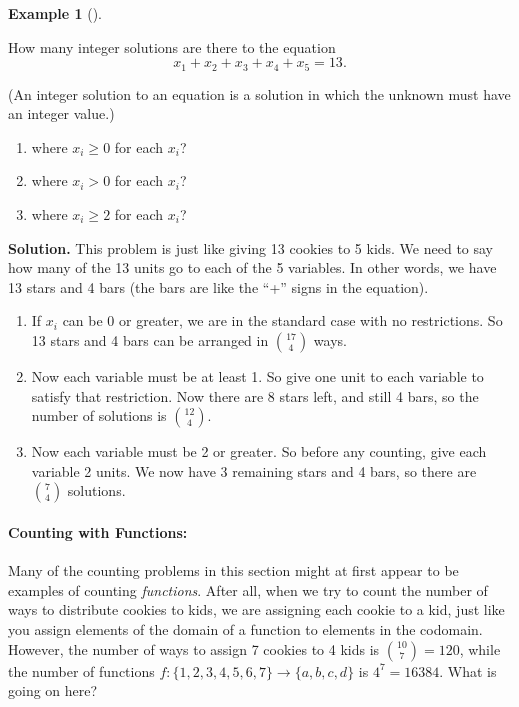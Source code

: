 \documentclass[10pt,]{book}
\theoremstyle{plain}
\theoremstyle{definition}
\newtheorem{example}[theorem]{Example}
\theoremstyle{definition}
\theoremstyle{definition}
\numberwithin{equation}{chapter}
\begin{document}
\begin{example}[]\label{ex_stars-bars-int-sol}

How many integer solutions are there to the equation
\begin{equation*}
  x_1 + x_2 + x_3 + x_4 + x_5 = 13.
\end{equation*}
%
\par

(An integer solution to an equation is a solution in which the unknown must have an integer value.)
%
\leavevmode%
\begin{enumerate}
\item\hypertarget{li-566}{}
where \(x_i \ge 0\) for each \(x_i\)?
%
\item\hypertarget{li-567}{}
where \(x_i > 0\) for each \(x_i\)?
%
\item\hypertarget{li-568}{}
where \(x_i \ge 2\) for each \(x_i\)?
%
\end{enumerate}
\par\medskip\noindent%
\textbf{Solution.}\quad
This problem is just like giving 13 cookies to 5 kids. We need to say how many of the 13 units go to each of the 5 variables. In other words, we have 13 stars and 4 bars (the bars are like the ``+'' signs in the equation).
%
\leavevmode%
\begin{enumerate}
\item\hypertarget{li-569}{}
If \(x_i\) can be 0 or greater, we are in the standard case with no restrictions.  So 13 stars and 4 bars can be arranged in \({17 \choose 4}\) ways.
%
\item\hypertarget{li-570}{}
Now each variable must be at least 1.  So give one unit to each variable to satisfy that restriction.  Now there are 8 stars left, and still 4 bars, so the number of solutions is \({12 \choose 4}\).
%
\item\hypertarget{li-571}{}
Now each variable must be 2 or greater.  So before any counting, give each variable 2 units.  We now have 3 remaining stars and 4 bars, so there are \({7 \choose 4}\) solutions.
%
\end{enumerate}
\end{example}
\typeout{************************************************}
\typeout{************************************************}
\paragraph[Counting with Functions:]{Counting with Functions:}\hypertarget{paragraphs-6}{}
 Many of the counting problems in this section might at first appear to be examples of counting \emph{functions}.  After all, when we try to count the number of ways to distribute cookies to kids, we are assigning each cookie to a kid, just like you assign elements of the domain of a function to elements in the codomain.  However, the number of ways to assign 7 cookies to 4 kids is \({10 \choose 7} = 120\), while the number of functions \(f: \{1,2,3,4,5,6,7\} \to \{a,b,c,d\}\) is \(4^7 = 16384\).  What is going on here? %
\par
\end{document}
